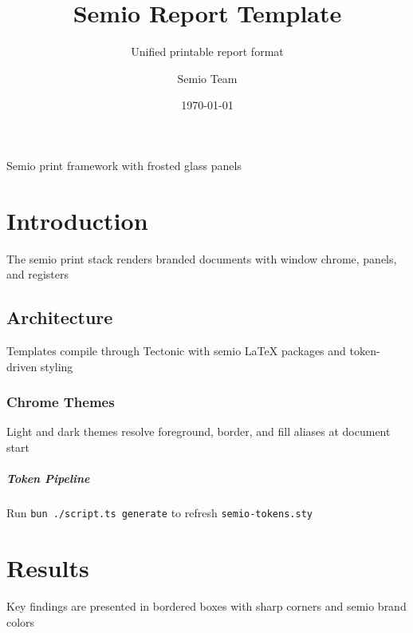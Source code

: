 \title{Semio Report Template}
\author{Semio Team}
\date{\today}
\subtitle{Unified printable report format}




\maketitle
\tableofcontents

\begin{Panel}[anchor=top-right, x=1cm, y=5cm, width=5.5cm]
  Semio print framework with frosted glass panels
\end{Panel}

\chapter{Introduction}
The semio print stack renders branded documents with window chrome, panels, and registers

\section{Architecture}
\begin{Window}[title=Print Pipeline]
  Templates compile through Tectonic with semio LaTeX packages and token-driven styling
\end{Window}

\subsection{Chrome Themes}
Light and dark themes resolve foreground, border, and fill aliases at document start

\paragraph{Token Pipeline}
Run \texttt{bun ./script.ts generate} to refresh \texttt{semio-tokens.sty}

\chapter{Results}
\begin{Blockquote}
  Key findings are presented in bordered boxes with sharp corners and semio brand colors
\end{Blockquote}

